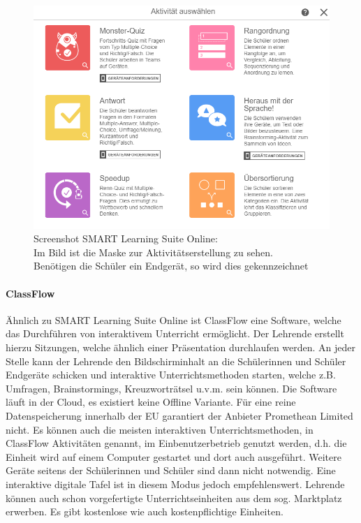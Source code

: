 \begin{figure}[H]
	\centering
	\includegraphics[width=0.8\linewidth]{bilder/screenshot_slo}
	\caption[Screenshot SMART Learning Suite Online]{Screenshot SMART Learning Suite Online:\\ Im Bild ist die Maske zur Aktivitätserstellung zu sehen. \\ Benötigen die Schüler ein Endgerät, so wird dies gekennzeichnet \cite{slso}}
	\label{fig:slso}
\end{figure}

\paragraph{ClassFlow}
Ähnlich zu SMART Learning Suite Online ist ClassFlow eine Software, welche das 
Durchführen von interaktivem Unterricht ermöglicht. Der Lehrende erstellt hierzu Sitzungen, welche ähnlich einer Präsentation durchlaufen werden. An jeder Stelle kann der Lehrende den Bildschirminhalt an die Schülerinnen und Schüler Endgeräte schicken und interaktive Unterrichtsmethoden starten, welche z.B. Umfragen, Brainstormings, Kreuzworträtsel u.v.m. sein können. Die Software läuft in der Cloud, es existiert keine Offline Variante. Für eine reine Datenspeicherung innerhalb der EU garantiert der Anbieter Promethean Limited nicht\cite{Limited2017}. Es können auch die meisten interaktiven Unterrichtsmethoden, in ClassFlow Aktivitäten genannt, im Einbenutzerbetrieb genutzt werden, d.h. die Einheit wird auf einem Computer gestartet und dort auch ausgeführt. Weitere Geräte seitens der Schülerinnen und Schüler sind dann nicht notwendig. Eine interaktive digitale Tafel ist in diesem Modus jedoch empfehlenswert. Lehrende können auch schon vorgefertigte Unterrichtseinheiten aus dem sog. Marktplatz erwerben. Es gibt kostenlose wie auch kostenpflichtige Einheiten. 

